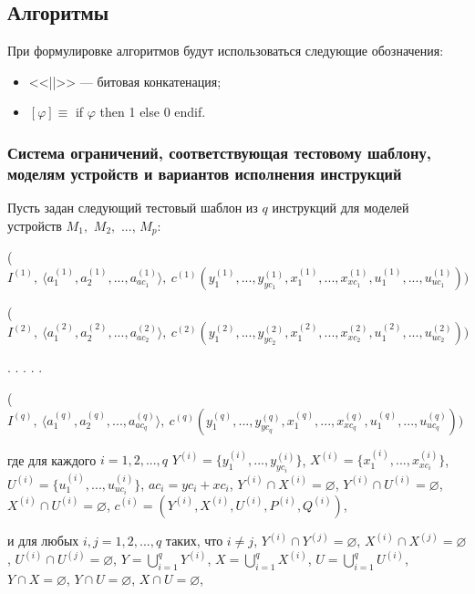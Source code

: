 \subsection{Алгоритмы}\label{sec:algorithms}

При формулировке алгоритмов будут использоваться следующие обозначения:
\begin{itemize}
  \item <<||>> --- битовая конкатенация;
  \item $[\varphi] \equiv $ if $\varphi$ then 1 else 0 endif.
\end{itemize}

\subsubsection*{Система ограничений, соответствующая тестовому шаблону, моделям устройств и вариантов исполнения инструкций}

Пусть задан следующий тестовый шаблон из $q$ инструкций для моделей устройств $M_1,$ $M_2,$ ..., $M_p$:

($I^{(1)},~\langle a_1^{(1)},a_2^{(1)},...,a_{ac_1}^{(1)}\rangle,~c^{(1)}( y_1^{(1)}, ..., y_{yc_1}^{(1)}, x_1^{(1)}, ..., x_{xc_1}^{(1)}, u_1^{(1)}, ..., u_{uc_1}^{(1)}))$

($I^{(2)},~\langle a_1^{(2)},a_2^{(2)},...,a_{ac_2}^{(2)}\rangle,~c^{(2)}( y_1^{(2)}, ..., y_{yc_2}^{(2)}, x_1^{(2)}, ..., x_{xc_2}^{(2)}, u_1^{(2)}, ..., u_{uc_2}^{(2)}))$

. . . . .

($I^{(q)},~\langle a_1^{(q)},a_2^{(q)},...,a_{ac_q}^{(q)}\rangle,~c^{(q)}( y_1^{(q)}, ..., y_{yc_q}^{(q)}, x_1^{(q)}, ..., x_{xc_q}^{(q)}, u_1^{(q)}, ..., u_{uc_q}^{(q)}))$

где для каждого $i = 1, 2, ..., q$ $Y^{(i)} = \{ y_1^{(i)}, ..., y_{yc_i}^{(i)} \}$, $X^{(i)} = \{ x_1^{(i)}, ..., x_{xc_i}^{(i)} \}$, $U^{(i)} = \{ u_1^{(i)}, ..., u_{uc_i}^{(i)} \}$, $ac_i = yc_i + xc_i$, $Y^{(i)} \cap X^{(i)} = \varnothing$, $Y^{(i)} \cap U^{(i)} = \varnothing$, $X^{(i)} \cap U^{(i)} = \varnothing$, $c^{(i)} = (Y^{(i)}, X^{(i)}, U^{(i)}, P^{(i)}, Q^{(i)})$,

и для любых $i, j = 1, 2, ..., q$ таких, что $i \neq j$, $Y^{(i)} \cap Y^{(j)} = \varnothing$, $X^{(i)} \cap X^{(j)} = \varnothing$, $U^{(i)} \cap U^{(j)} = \varnothing$, $Y = \bigcup_{i=1}^q Y^{(i)}$, $X = \bigcup_{i=1}^q X^{(i)}$, $U = \bigcup_{i=1}^q U^{(i)}$, $Y \cap X = \varnothing$, $Y \cap U = \varnothing$, $X \cap U = \varnothing$,

